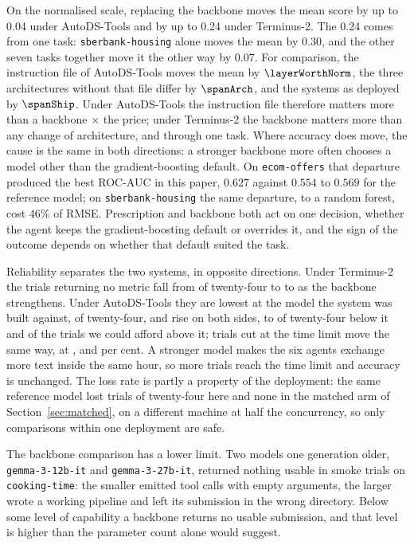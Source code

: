 On the normalised scale, replacing the backbone moves the mean score by up to
0.04 under AutoDS-Tools and by up to 0.24 under Terminus-2. The 0.24 comes
from one task: \texttt{sberbank-housing} alone moves the mean by $0.30$, and
the other seven tasks together move it the other way by $0.07$. For
comparison, the instruction file of AutoDS-Tools moves the mean by
$\layerWorthNorm$, the three architectures without that file differ by
$\spanArch$, and the systems as deployed by $\spanShip$. Under AutoDS-Tools
the instruction file therefore matters more than a backbone
\axPriceSpread$\times$ the price; under Terminus-2 the backbone matters more
than any change of architecture, and through one task. Where accuracy does
move, the cause is the same in both directions: a stronger
backbone more often chooses a model other than the gradient-boosting default. On
\texttt{ecom-offers} that departure produced the best ROC-AUC in this paper,
$0.627$ against $0.554$ to $0.569$ for the reference model; on
\texttt{sberbank-housing} the same departure, to a random forest, cost $46\%$
of RMSE. Prescription and backbone both act on one decision, whether the agent keeps the
gradient-boosting default or overrides it, and the sign of the outcome depends
on whether that default suited the task.

Reliability separates the two systems, in opposite directions. Under
Terminus-2 the trials returning no metric fall from \axTerminusSmallLost{} of
twenty-four to \axTerminusRefLost{} to \axTerminusBigLost{} as the backbone
strengthens. Under AutoDS-Tools they are lowest at the model the system was
built against, \axAutoDSRefLost{} of twenty-four, and rise on both sides, to
\axAutoDSSmallLost{} of twenty-four below it and \axAutoDSBigLost{} of the
\axAutoDSBigTrials{} trials we could afford above it; trials cut at the time
limit move the same way, at \axAutoDSRefCutPct{}, \axAutoDSSmallCutPct{} and
\axAutoDSBigCutPct{} per cent. A stronger model makes the six agents exchange
more text inside the same hour, so more trials reach the time limit and
accuracy is unchanged. The loss rate is partly a property of the deployment:
the same reference model lost \axTerminusRefLost{} trials of twenty-four here
and none in the matched arm of Section~\ref{sec:matched}, on a different
machine at half the concurrency, so only comparisons within one deployment
are safe.

The backbone comparison has a lower limit. Two models one generation
older, \texttt{gemma-3-12b-it} and \texttt{gemma-3-27b-it}, returned nothing
usable in smoke trials on \texttt{cooking-time}: the smaller emitted tool
calls with empty arguments, the larger wrote a working pipeline and left its
submission in the wrong directory. Below some level of capability a backbone
returns no usable submission, and that level is higher than the parameter
count alone would suggest.

